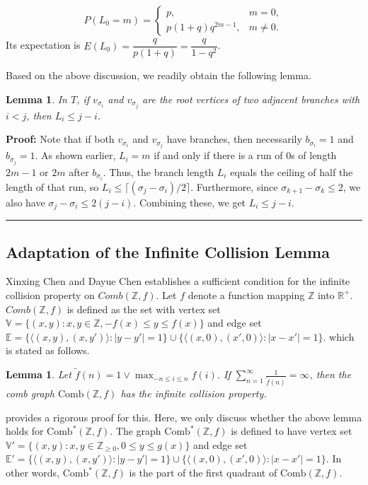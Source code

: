 \documentclass[10pt,twoside]{article}
\newtheorem{lemma}[theorem]{Lemma}
\renewenvironment{proof}[1]{\noindent\textbf{#1}}{\ \rule{0.5em}{0.5em}}
\begin{document}
\begin{eqnarray}
P(L_0 = m) =
\begin{cases}
p, & m = 0,\\
p (1 + q) q^{2m-1}, & m \neq 0.
\end{cases}
\end{eqnarray}Its expectation is $E(L_0) = \dfrac{q}{p(1+q)} = \dfrac{q}{1-q^2}$.

Based on the above discussion, we readily obtain the following lemma.
\begin{lemma}\label{lem1}
In $T$, if $v_{\sigma_i}$ and $v_{\sigma_j}$ are the root vertices of two adjacent branches with $i < j$, then $L_i \leq j - i$.
\end{lemma}

\begin{proof}
P\textbf{roof: }Note that if both $v_{\sigma_i}$ and $v_{\sigma_j}$ have branches, then necessarily $b_{\sigma_i} = 1$ and $b_{\sigma_j} = 1$. As shown earlier, $L_i = m$ if and only if there is a run of $0$s of length $2m-1$ or $2m$ after $b_{\sigma_i}$. Thus, the branch length $L_i$ equals the ceiling of half the length of that run, so $L_i \leq \lceil (\sigma_j - \sigma_i)/2 \rceil$. Furthermore, since $\sigma_{k+1} - \sigma_k \leq 2$, we also have $\sigma_j - \sigma_i \leq 2(j - i)$. Combining these, we get $L_i \leq j - i$.
\end{proof}

\subsection{Adaptation of the Infinite Collision Lemma}\label{sub3}
Xinxing Chen and Dayue Chen \cite{CC2011} establishes a sufficient condition for the infinite collision property on $Comb(\mathbb{Z},f)$. Let $f$ denote a function mapping $\mathbb{Z}$ into $\mathbb{R}^+$. $Comb(\mathbb{Z}, f)$ is defined as the set with vertex set $\mathbb{V}=\{(x,y):x,y\in \mathbb{Z}, -f(x)\leq y\leq f(x)\}$ and edge set $\mathbb{E}=\{\langle (x,y), (x,y')\rangle:|y-y'|=1\}\cup \{\langle (x,0), (x',0)\rangle:|x-x'|=1\}$. which is stated as follows.
\begin{lemma}\label{lem2}
Let $\tilde{f}(n) = 1 \vee \max_{-n \leq i \leq n} f(i)$. If $\sum_{n=1}^{\infty} \frac{1}{\tilde{f}(n)} = \infty$, then the comb graph $\mathrm{Comb}(\mathbb{Z}, f)$ has the infinite collision property.
\end{lemma}
 
\cite{CC2011} provides a rigorous proof for this. Here, we only discuss whether the above lemma holds for  $\mathrm{Comb}^*(\mathbb{Z}, f)$. The graph $\mathrm{Comb}^*(\mathbb{Z}, f)$ is defined to have vertex set $\mathbb{V'} = \{(x, y) : x, y \in \mathbb{Z}_{\geq 0}, 0 \leq y \leq g(x)\}$ and edge set $\mathbb{E'} = \{\langle (x, y), (x, y') \rangle : |y - y'| = 1\} \cup \{\langle (x, 0), (x', 0) \rangle : |x - x'| = 1\}$. In other words, $\mathrm{Comb}^*(\mathbb{Z}, f)$ is the part of the first quadrant of $\mathrm{Comb}(\mathbb{Z}, f)$.
\end{document}
